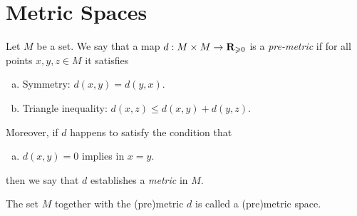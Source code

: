 \section{Metric Spaces}


\begin{definition}
    \label{def:premetric-and-metric-space}
    Let \(M\) be a set. We say that a map \(d: M \times M \to \mathbf{R}_{\geqslant 0}\) is a
    \emph{pre-metric} if for all points \(x, y, z \in M\) it satisfies
    \begin{enumerate}[(a)]\setlength\itemsep{0em}
        \item Symmetry: \(d(x, y) = d(y, x)\).
        \item Triangle inequality: \(d(x, z) \leq d(x, y) + d(y, z)\).
    \end{enumerate}
    Moreover, if \(d\) happens to satisfy the condition that
    \begin{enumerate}[(a)]\setlength\itemsep{0em}\setcounter{enumi}{2}
        \item \(d(x, y) = 0\) implies in \(x = y\).
    \end{enumerate}
    then we say that \(d\) establishes a \emph{metric} in \(M\).

    The set \(M\) together with the (pre)metric \(d\) is called a (pre)metric space.
\end{definition}

